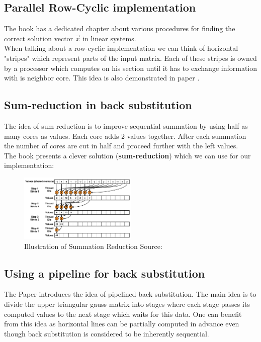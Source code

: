 \documentclass[draft, final]{vutinfth} %
\begin{document}
		\subsection{Parallel Row-Cyclic implementation}
			The book \cite{opac-b1133063} has a dedicated chapter about various procedures for finding the correct solution vector $\vec{x}$ in linear systems.\\
			When talking about a row-cyclic implementation we can think of horizontal "stripes" which represent parts of the input matrix. Each of these stripes is owned by a processor which computes on his section until it has to exchange information with is neighbor core. This idea is also demonstrated in paper \cite{parmeth}.

		\subsection{Sum-reduction in back substitution}
			The idea of sum reduction is to improve sequential summation by using half as many cores as values. Each core adds 2 values together. After each summation the number of cores are cut in half and proceed further with the left values.\\
			The book \cite{Sanders:2010:CEI:1891996} presents a clever solution (\textbf{sum-reduction}) which we can use for our implementation:

			\begin{figure}[!ht]
			    \centering
			    \includegraphics[width=0.5\textwidth,keepaspectratio=true]{images/tUUzE.png}
			    \caption{Illustration of Summation Reduction Source: \cite{stack:overflow_2014}}
			    \label{fig:summ_red}
			\end{figure}

		\subsection{Using a pipeline for back substitution}
			The Paper \cite{pipelinecomp} introduces the idea of pipelined back substitution. The main idea is to divide the upper triangular gauss matrix into stages where each stage passes its computed values to the next stage which waits for this data. One can benefit from this idea as horizontal lines can be partially computed in advance even though back substitution is considered to be inherently sequential. \cite{opac-b1133063}
\end{document}

